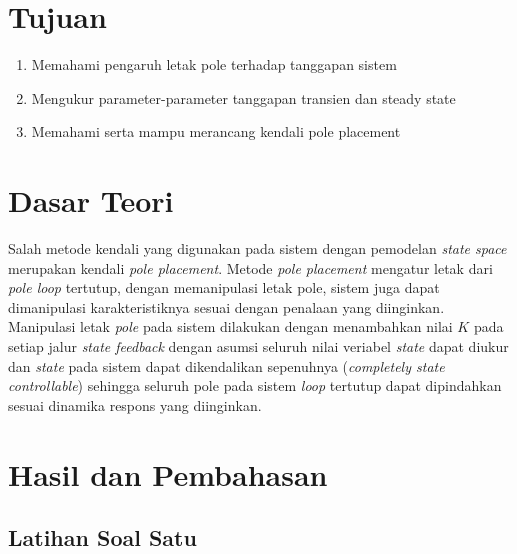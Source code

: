 \documentclass[../main.tex]{subfiles}
\begin{document}
    \section{Tujuan}
        \begin{enumerate}
            \item Memahami pengaruh letak pole terhadap tanggapan sistem
            \item Mengukur parameter-parameter tanggapan transien dan steady state
            \item Memahami serta mampu merancang kendali pole placement
        \end{enumerate}
    \section{Dasar Teori}
        Salah metode kendali yang digunakan pada sistem dengan pemodelan \textit{state space} merupakan kendali \textit{pole placement}. Metode \textit{pole placement} mengatur letak dari \textit{pole loop} tertutup, dengan memanipulasi letak pole, sistem juga dapat dimanipulasi karakteristiknya sesuai dengan penalaan yang diinginkan. Manipulasi letak \textit{pole} pada sistem  dilakukan dengan menambahkan nilai $K$ pada setiap jalur \textit{state feedback} dengan asumsi seluruh nilai veriabel \textit{state} dapat diukur dan \textit{state} pada sistem dapat dikendalikan sepenuhnya (\textit{completely state controllable}) sehingga seluruh pole pada sistem \textit{loop} tertutup dapat dipindahkan sesuai dinamika respons yang diinginkan\cite{Fahmizal}.
    \section{Hasil dan Pembahasan}
        \subsection{Latihan Soal Satu}
\end{document}
